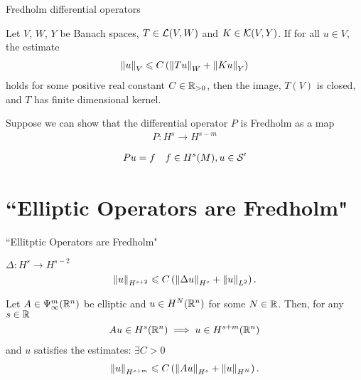 \documentclass{beamer}
\begin{document}
\begin{frame}{Fredholm differential operators}
\begin{theorem} \label{theorem: fredholm estimates}
    Let $V$, $W$, $Y$ be Banach spaces, $T \in \L(V, W)$ and $K \in \K(V, Y)$. If for all $u \in V$, the estimate 
    \begin{align*}
    \norm[u]_V \leq C \brac{\norm[Tu]_W + \norm[Ku]_Y}
    \end{align*}
    holds for some positive real constant $C \in \R_{> 0}$, then the image, $T(V)$ is closed, and $T$ has finite dimensional kernel. 
\end{theorem}

Suppose we can show that the differential operator $P$ is Fredholm as a map 
\begin{align*}
P : H^{s} \to H^{s - m}
\end{align*}

\begin{align*}
Pu = f \quad f \in H^s(M), u \in \sch'
\end{align*}

\end{frame}
\section{``Elliptic Operators are Fredholm"} 
\begin{frame}{``Ellitptic Operators are Fredholm"}
\begin{example}[Laplacian]
    $\Delta: H^{s} \to H^{s - 2}$
    \begin{align*}
    \norm[u]_{H^{s + 2}} \leq C \brac{\norm[\Delta u]_{H^s} + \norm[u]_{L^2}}. 
    \end{align*}
\end{example}

\begin{proposition}
    Let $A \in \Psi^{m}_{\infty}(\R^n)$ be elliptic and $u \in H^{N}(\R^n)$ for some $N \in \R$. Then, for any $s \in \R$
    \begin{align*}
    Au \in H^{s}(\R^n) \implies u \in H^{s + m}(\R^n)
    \end{align*}
    and $u$ satisfies the estimates: $\exists C > 0$
    \begin{align*}
    \norm[u]_{H^{s + m}} \leq C \brac{\norm[Au]_{H^s} + \norm[u]_{H^N}}. 
    \end{align*}
\end{proposition}



\end{frame}
\end{document}
